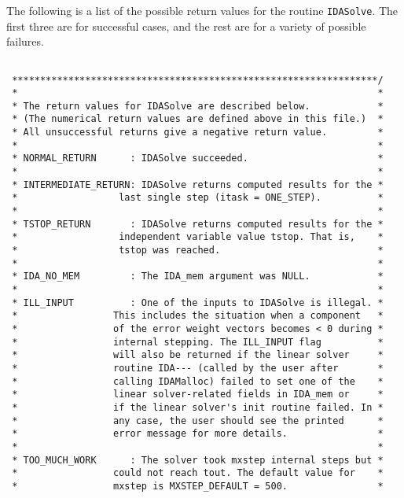 \begin{verbatim}
\end{verbatim}
\normalsize

The following is a list of the possible return values for the routine
{\tt IDASolve}.  The first three are for successful cases, and the
rest are for a variety of possible failures.

\small
\begin{verbatim}

 *****************************************************************/
 *                                                                *
 * The return values for IDASolve are described below.            *
 * (The numerical return values are defined above in this file.)  *
 * All unsuccessful returns give a negative return value.         *
 *                                                                *
 * NORMAL_RETURN      : IDASolve succeeded.                       *
 *                                                                *
 * INTERMEDIATE_RETURN: IDASolve returns computed results for the *
 *                  last single step (itask = ONE_STEP).          *
 *                                                                *
 * TSTOP_RETURN       : IDASolve returns computed results for the *
 *                  independent variable value tstop. That is,    *
 *                  tstop was reached.                            *
 *                                                                *
 * IDA_NO_MEM         : The IDA_mem argument was NULL.            *
 *                                                                *
 * ILL_INPUT          : One of the inputs to IDASolve is illegal. *
 *                 This includes the situation when a component   *
 *                 of the error weight vectors becomes < 0 during *
 *                 internal stepping. The ILL_INPUT flag          *
 *                 will also be returned if the linear solver     *
 *                 routine IDA--- (called by the user after       *
 *                 calling IDAMalloc) failed to set one of the    *
 *                 linear solver-related fields in IDA_mem or     *
 *                 if the linear solver's init routine failed. In *
 *                 any case, the user should see the printed      *
 *                 error message for more details.                *
 *                                                                *
 * TOO_MUCH_WORK      : The solver took mxstep internal steps but *
 *                 could not reach tout. The default value for    *
 *                 mxstep is MXSTEP_DEFAULT = 500.                *

\end{verbatim}
